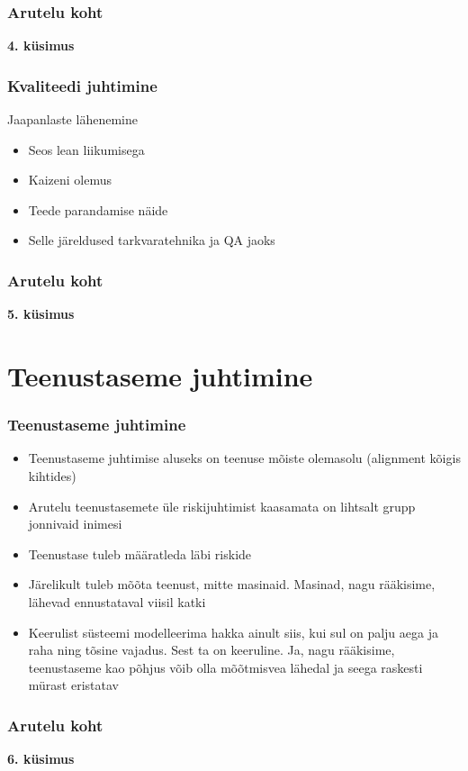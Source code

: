 \begin{frame}[fragile]
  \frametitle{Arutelu koht}
		\begin{center}
			\textbf{4. küsimus}
		\end{center}
\end{frame}

\begin{frame}[fragile]
  \frametitle{Kvaliteedi juhtimine}
	Jaapanlaste lähenemine
	\begin{itemize}
		\item Seos lean liikumisega
		\item Kaizeni olemus
		\item Teede parandamise näide
		\item Selle järeldused tarkvaratehnika ja QA jaoks
	\end{itemize}
\end{frame}

\begin{frame}[fragile]
  \frametitle{Arutelu koht}
		\begin{center}
			\textbf{5. küsimus}
		\end{center}
\end{frame}


\section{Teenustaseme juhtimine}
\begin{frame}[fragile]
  \frametitle{Teenustaseme juhtimine}
	\begin{itemize}
		\item Teenustaseme juhtimise aluseks on teenuse mõiste olemasolu (alignment kõigis kihtides)
		\item Arutelu teenustasemete üle riskijuhtimist kaasamata on lihtsalt grupp jonnivaid inimesi
		\item Teenustase tuleb määratleda läbi riskide
		\item Järelikult tuleb mõõta teenust, mitte masinaid. Masinad, nagu rääkisime, lähevad ennustataval viisil katki
		\item Keerulist süsteemi modelleerima hakka ainult siis, kui sul on palju aega ja raha ning tõsine vajadus. Sest ta on keeruline. Ja, nagu rääkisime, teenustaseme kao põhjus võib olla mõõtmisvea lähedal ja seega raskesti mürast eristatav
	\end{itemize}
\end{frame}


\begin{frame}[fragile]
  \frametitle{Arutelu koht}
		\begin{center}
			\textbf{6. küsimus}
		\end{center}
\end{frame}


